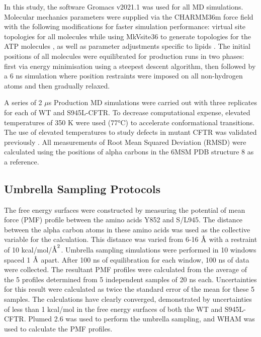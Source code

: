 In this study, the software Gromacs v2021.1 \cite{abraham2015} was used for all MD simulations. Molecular mechanics parameters were supplied via the CHARMM36m\cite{huang2016} force field with the following modifications for faster simulation performance: virtual site topologies \cite{feenstra1999} for all molecules while using MkVsite36 to generate topologies for the ATP molecules \cite{larsson2020}, as well as parameter adjustments specific to lipids \cite{olesen2018}. The initial positions of all molecules were equilibrated for production runs in two phases: first via energy minimisation using a steepest descent algorithm, then followed by a 6 ns simulation where position restraints were imposed on all non-hydrogen atoms and then gradually relaxed. 

A series of 2 $\mu$s Production MD simulations were carried out with three replicates for each of WT and S945L-CFTR. To decrease computational expense, elevated temperatures of 350 K were used (77°C) to accelerate conformational transitions. The use of elevated temperatures to study defects in mutant CFTR was validated previously \cite{wong2022}. All measurements of Root Mean Squared Deviation (RMSD) were calculated using the positions of alpha carbons in the 6MSM PDB structure 8 as a reference. 

\subsection{Umbrella Sampling Protocols}
The free energy surfaces were constructed by measuring the potential of mean force (PMF) profile between the amino acids Y852 and S/L945. The distance between the alpha carbon atoms in these amino acids was used as the collective variable for the calculation. This distance was varied from 6-16 $\mbox{\textup{\AA}}$ with a restraint of 10 kcal/mol/$\mbox{\textup{\AA}}^2$. Umbrella sampling simulations were performed in 10 windows spaced 1 $\mbox{\textup{\AA}}$ apart. After 100 ns of equilibration for each window, 100 ns of data were collected. The resultant PMF profiles were calculated from the average of the 5 profiles determined from 5 independent samples of 20 ns each. Uncertainties for this result were calculated as twice the standard error of the mean for these 5 samples. The calculations have clearly converged, demonstrated by uncertainties of less than 1 kcal/mol in the free energy surfaces of both the WT and S945L-CFTR. Plumed 2.6 \cite{bonomi2009, tribello2014, bonomi2019} was used to perform the umbrella sampling, and WHAM \cite{grossfield2012} was used to calculate the PMF profiles. 
